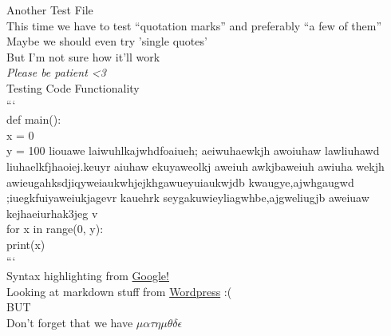 \documentclass[12pt]{article}
\begin{document}
\raggedright
{\Huge Another Test File}\\
This time we have to test ``quotation marks'' and preferably ``a few of them''\\
Maybe we should even try 'single quotes'\\
{\Large But I'm not sure how it'll work}\\
\textit{Please be patient <3}\\
{\LARGE Testing Code Functionality}\\
```\\
def main():\\
x = 0\\
y = 100 liouawe laiwuhlkajwhdfoaiueh; aeiwuhaewkjh awoiuhaw lawliuhawd liuhaelkfjhaoiej.keuyr aiuhaw ekuyaweolkj aweiuh awkjbaweiuh awiuha wekjh awieugahksdjiqyweiaukwhjejkhgawueyuiaukwjdb kwaugye,ajwhgaugwd ;iuegkfuiyaweiukjagevr kauehrk seygakuwieyliagwhbe,ajgweliugjb aweiuaw kejhaeiurhak3jeg v\\
for x in range(0, y):\\
print(x)\\
```\\
Syntax highlighting from \href{https://github.com/google/code-prettify}{Google!}\\
Looking at markdown stuff from \href{https://en.support.wordpress.com/markdown-quick-reference/}{Wordpress}  :(\\
{\Large BUT}\\
Don't forget that we have $\mu\alpha \tau \eta \mu\theta\delta\epsilon$\\
\end{document}
